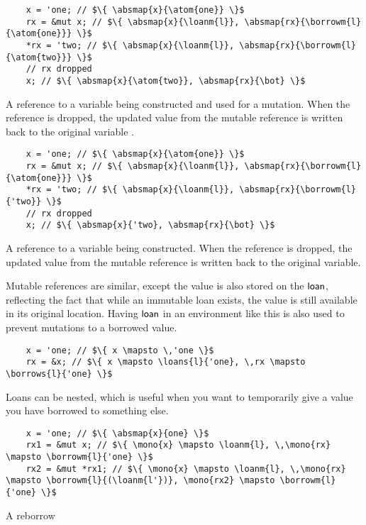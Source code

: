 \documentclass[12pt,twoside]{report}
\begin{document}
\begin{listing}[H]
  \begin{verbatim}
    x = 'one; // $\{ \absmap{x}{\atom{one}} \}$
    rx = &mut x; // $\{ \absmap{x}{\loanm{l}}, \absmap{rx}{\borrowm{l}{\atom{one}}} \}$
    *rx = 'two; // $\{ \absmap{x}{\loanm{l}}, \absmap{rx}{\borrowm{l}{\atom{two}}} \}$
    // rx dropped
    x; // $\{ \absmap{x}{\atom{two}}, \absmap{rx}{\bot} \}$
  \end{verbatim}
  \caption{A reference to a variable being constructed and used for a mutation. When the reference  is dropped, the updated value from the mutable reference is written back to the original variable .}
\end{listing}

\begin{listing}[H]
  \begin{verbatim}
    x = 'one; // $\{ \absmap{x}{\atom{one}} \}$
    rx = &mut x; // $\{ \absmap{x}{\loanm{l}}, \absmap{rx}{\borrowm{l}{\atom{one}}} \}$
    *rx = 'two; // $\{ \absmap{x}{\loanm{l}}, \absmap{rx}{\borrowm{l}{'two}} \}$
    // rx dropped
    x; // $\{ \absmap{x}{'two}, \absmap{rx}{\bot} \}$
  \end{verbatim}
  \caption{A reference to a variable being constructed. When the reference is dropped, the updated value from the mutable reference is written back to the original variable.}
\end{listing}

Mutable references are similar, except the value is also stored on the $\mathsf{loan}$, reflecting the fact that while an immutable loan exists, the value is still available in its original location. Having $\mathsf{loan}$ in an environment like this is also used to prevent mutations to a borrowed value.

\begin{listing}[H]
  \begin{verbatim}
    x = 'one; // $\{ x \mapsto \,'one \}$
    rx = &x; // $\{ x \mapsto \loans{l}{'one}, \,rx \mapsto \borrows{l}{'one} \}$
  \end{verbatim}
\end{listing}

Loans can be nested, which is useful when you want to temporarily give a value you have borrowed to something else.

\begin{listing}[H]
  \begin{verbatim}
    x = 'one; // $\{ \absmap{x}{one} \}$
    rx1 = &mut x; // $\{ \mono{x} \mapsto \loanm{l}, \,\mono{rx} \mapsto \borrowm{l}{'one} \}$
    rx2 = &mut *rx1; // $\{ \mono{x} \mapsto \loanm{l}, \,\mono{rx} \mapsto \borrowm{l}{(\loanm{l'})}, \mono{rx2} \mapsto \borrowm{l}{'one} \}$
  \end{verbatim}
  \caption{A reborrow}
\end{listing}
\end{document}
